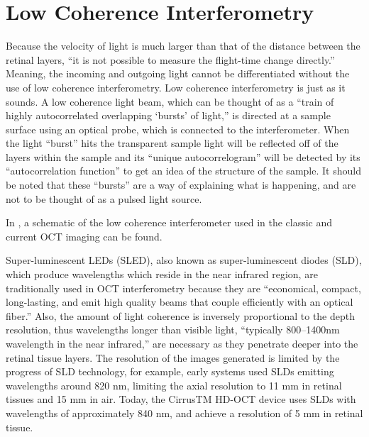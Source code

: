 \section{Low Coherence Interferometry}
Because the velocity of light is much larger than that of the distance between the retinal layers, “it is not possible to measure the flight-time change directly.” \cite{} Meaning, the incoming and outgoing light cannot be differentiated without the use of low coherence interferometry. Low coherence interferometry is just as it sounds.  A low coherence light beam, which can be thought of as a “train of highly autocorrelated overlapping ‘bursts’ of light,” \cite{} is directed at a sample surface using an optical probe, which is connected to the interferometer.  When the light “burst” hits the transparent sample light will be reflected off of the layers within the sample and its “unique autocorrelogram” \cite{} will be detected by its “autocorrelation function” \cite{} to get an idea of the structure of the sample. \cite{} \cite{} It should be noted that these “bursts” are a way of explaining what is happening, and are not to be thought of as a pulsed light source.

In , a schematic of the low coherence interferometer used in the classic and current OCT imaging can be found.


Super-luminescent LEDs (SLED), also known as super-luminescent diodes (SLD), which produce wavelengths which reside in the near infrared region, are traditionally used in OCT interferometry because they are “economical, compact, long-lasting, and emit high quality beams that couple efficiently with an optical fiber.” \cite{} Also, the amount of light coherence is inversely proportional to the depth resolution, thus wavelengths longer than visible light, “typically 800–1400nm wavelength in the near infrared,” are necessary as they penetrate deeper into the retinal tissue layers. \cite{} \cite{} The resolution of the images generated is limited by the progress of SLD technology, for example, early systems used SLDs emitting wavelengths around 820 nm, limiting the axial resolution to 11 mm in retinal tissues and 15 mm in air. \cite{}  Today, the CirrusTM HD-OCT device uses SLDs with wavelengths of approximately 840 nm, and achieve a resolution of 5 mm in retinal tissue. \cite{}


